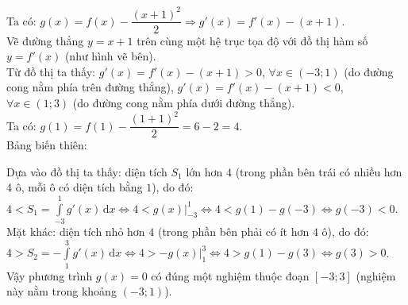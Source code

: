 \begin{ex}
{\begin{center}
		\end{center}
		Ta có: $g(x)=f(x)-\dfrac{(x+1)^2}{2}\Rightarrow g'(x)=f'(x)-(x+1)$.\\
		Vẽ đường thẳng $y=x+1$ trên cùng một hệ trục tọa độ với đồ thị hàm số $y=f'(x)$ (như hình vẽ bên).\\
		Từ đồ thị ta thấy: $g'(x)=f'(x)-(x+1)>0$, $\forall x\in(-3;1)$ (do đường cong nằm phía trên đường thẳng), $g'(x)=f'(x)-(x+1)<0$, $\forall x\in(1;3)$ (do đường cong nằm phía dưới đường thẳng).\\
		Ta có: $g(1)=f(1)-\dfrac{(1+1)^2}{2} =6-2=4$.\\
		Bảng biến thiên: 
		\begin{center}
		\end{center}
		Dựa vào đồ thị ta thấy: diện tích $S_1$ lớn hơn $4$ (trong phần bên trái có nhiều hơn 4 ô, mỗi ô có diện tích bằng $1$), do đó:\\
		$4<S_1=\displaystyle\int\limits_{-3}^1 g'(x)\mathrm{\,d}x\Leftrightarrow 4< g(x)\bigg|_{-3}^1\Leftrightarrow 4<g(1)-g(-3)\Leftrightarrow g(-3)<0$.\\
		Mặt khác: diện tích nhỏ hơn $4$ (trong phần bên phải có ít hơn $4$ ô), do đó:\\
		$4>S_2=-\displaystyle\int\limits_1^3 g'(x)\mathrm{\,d}x\Leftrightarrow 4 >- g(x)\bigg|_1^3\Leftrightarrow 4>g(1)-g(3)\Leftrightarrow g(3)>0$.\\
		Vậy phương trình $g(x)=0$ có đúng một nghiệm thuộc đoạn $[-3;3]$ (nghiệm này nằm trong khoảng $(-3;1)$).}
\end{ex}
